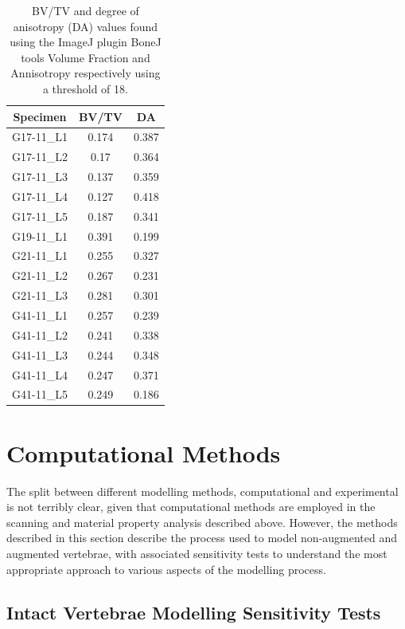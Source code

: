 \begin{table}[ht!]
	\caption{BV/TV and degree of anisotropy (DA) values found using the ImageJ
    plugin BoneJ tools Volume Fraction and Annisotropy respectively using a
    threshold of 18.}
	\label{tab:bv_tv_anis}
	\centering
	\begin{tabular}{c|c|c}
    Specimen                       & BV/TV & DA\\ \hline \hline
    G17-11\_L1  & 0.174 & 0.387 \\
    G17-11\_L2  & 0.17  & 0.364\\
    G17-11\_L3  & 0.137 & 0.359\\
    G17-11\_L4  & 0.127 & 0.418\\
    G17-11\_L5  & 0.187 & 0.341\\
    G19-11\_L1  & 0.391 & 0.199\\
    G21-11\_L1  & 0.255 & 0.327\\
    G21-11\_L2  & 0.267 & 0.231\\
    G21-11\_L3  & 0.281 & 0.301\\
    G41-11\_L1  & 0.257 & 0.239\\
    G41-11\_L2  & 0.241 & 0.338\\
    G41-11\_L3  & 0.244 & 0.348\\
    G41-11\_L4  & 0.247 & 0.371\\
    G41-11\_L5  & 0.249 & 0.186\\
    \hline
	\end{tabular}
\end{table}


\section{Computational Methods}

The split between different modelling methods, computational and experimental is not terribly clear, given that computational methods are employed in the scanning and material property analysis described above.
However, the methods described in this section describe the process used to model non-augmented and augmented vertebrae, with associated sensitivity tests to understand the most appropriate approach to various aspects of the modelling process.

\subsection{Intact Vertebrae Modelling Sensitivity Tests}

